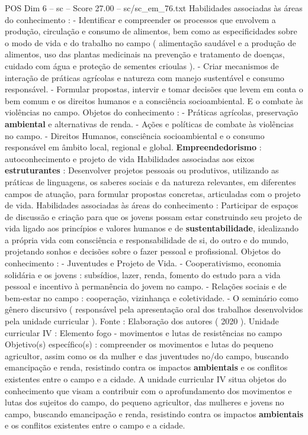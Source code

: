 \begin{textsample}{POS Dim 6 – sc – Score 27.00 – sc/sc\_em\_76.txt}
Habilidades associadas às áreas do conhecimento : - Identificar e compreender os processos que envolvem a produção, circulação e consumo de alimentos, bem como as especificidades sobre o modo de vida e do trabalho no campo ( alimentação saudável e a produção de alimentos, uso das plantas medicinais na prevenção e tratamento de doenças, cuidado com água e proteção de sementes crioulas ). - Criar mecanismos de interação de práticas agrícolas e natureza com manejo sustentável e consumo responsável. - Formular propostas, intervir e tomar decisões que levem em conta o bem comum e os direitos humanos e a consciência socioambiental.
E o combate às violências no campo.
Objetos do conhecimento : - Práticas agrícolas, preservação \textbf{ambiental} e alternativas de renda. - Ações e políticas de combate às violências no campo. - Direitos Humanos, consciência socioambiental e o consumo responsável em âmbito local, regional e global. \textbf{Empreendedorismo} : autoconhecimento e projeto de vida Habilidades associadas aos eixos \textbf{estruturantes} : Desenvolver projetos pessoais ou produtivos, utilizando as práticas de linguagens, os saberes sociais e da natureza relevantes, em diferentes campos de atuação, para formular propostas concretas, articuladas com o projeto de vida.
Habilidades associadas às áreas do conhecimento : Participar de espaços de discussão e criação para que os jovens possam estar construindo seu projeto de vida ligado aos princípios e valores humanos e de \textbf{sustentabilidade}, idealizando a própria vida com consciência e responsabilidade de si, do outro e do mundo, projetando sonhos e decisões sobre o fazer pessoal e profissional.
Objetos do conhecimento : - Juventudes e Projeto de Vida. - Cooperativismo, economia solidária e os jovens : subsídios, lazer, renda, fomento do estudo para a vida pessoal e incentivo à permanência do jovem no campo. - Relações sociais e de bem-estar no campo : cooperação, vizinhança e coletividade. - O seminário como gênero discursivo ( responsável pela apresentação oral dos trabalhos desenvolvidos pela unidade curricular ).
Fonte : Elaboração dos autores ( 2020 ).
Unidade curricular IV : Elemento fogo - movimentos e lutas de resistências no campo Objetivo(s) específico(s) : compreender os movimentos e lutas do pequeno agricultor, assim como os da mulher e das juventudes no/do campo, buscando emancipação e renda, resistindo contra os impactos \textbf{ambientais} e os conflitos existentes entre o campo e a cidade.
A unidade curricular IV situa objetos do conhecimento que visam a contribuir com o aprofundamento dos movimentos e lutas dos sujeitos do campo, do pequeno agricultor, das mulheres e jovens no campo, buscando emancipação e renda, resistindo contra os impactos \textbf{ambientais} e os conflitos existentes entre o campo e a cidade.

\end{textsample}
